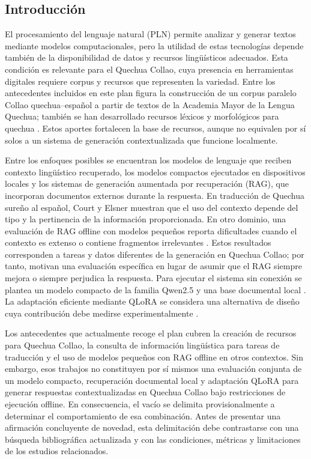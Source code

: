 
\subsection{Introducción}

El procesamiento del lenguaje natural (PLN) permite analizar y generar textos mediante modelos computacionales, pero la utilidad de estas tecnologías depende también de la disponibilidad de datos y recursos lingüísticos adecuados. Esta condición es relevante para el Quechua Collao, cuya presencia en herramientas digitales requiere corpus y recursos que representen la variedad. Entre los antecedentes incluidos en este plan figura la construcción de un corpus paralelo Collao quechua--español a partir de textos de la Academia Mayor de la Lengua Quechua; también se han desarrollado recursos léxicos y morfológicos para quechua \citep{Orcotoma2025,Duran2026}. Estos aportes fortalecen la base de recursos, aunque no equivalen por sí solos a un sistema de generación contextualizada que funcione localmente.

Entre los enfoques posibles se encuentran los modelos de lenguaje que reciben contexto lingüístico recuperado, los modelos compactos ejecutados en dispositivos locales y los sistemas de generación aumentada por recuperación (RAG), que incorporan documentos externos durante la respuesta. En traducción de Quechua sureño al español, Court y Elsner \citeyearpar{Court2024} muestran que el uso del contexto depende del tipo y la pertinencia de la información proporcionada. En otro dominio, una evaluación de RAG offline con modelos pequeños reporta dificultades cuando el contexto es extenso o contiene fragmentos irrelevantes \citep{Hevia2025}. Estos resultados corresponden a tareas y datos diferentes de la generación en Quechua Collao; por tanto, motivan una evaluación específica en lugar de asumir que el RAG siempre mejora o siempre perjudica la respuesta. Para ejecutar el sistema sin conexión se plantea un modelo compacto de la familia Qwen2.5 y una base documental local \citep{qwen2024,Xu2024}. La adaptación eficiente mediante QLoRA se considera una alternativa de diseño cuya contribución debe medirse experimentalmente \citep{Dettmers2023}.

Los antecedentes que actualmente recoge el plan cubren la creación de recursos para Quechua Collao, la consulta de información lingüística para tareas de traducción y el uso de modelos pequeños con RAG offline en otros contextos. Sin embargo, esos trabajos no constituyen por sí mismos una evaluación conjunta de un modelo compacto, recuperación documental local y adaptación QLoRA para generar respuestas contextualizadas en Quechua Collao bajo restricciones de ejecución offline. En consecuencia, el vacío se delimita provisionalmente a determinar el comportamiento de esa combinación. Antes de presentar una afirmación concluyente de novedad, esta delimitación debe contrastarse con una búsqueda bibliográfica actualizada y con las condiciones, métricas y limitaciones de los estudios relacionados.

